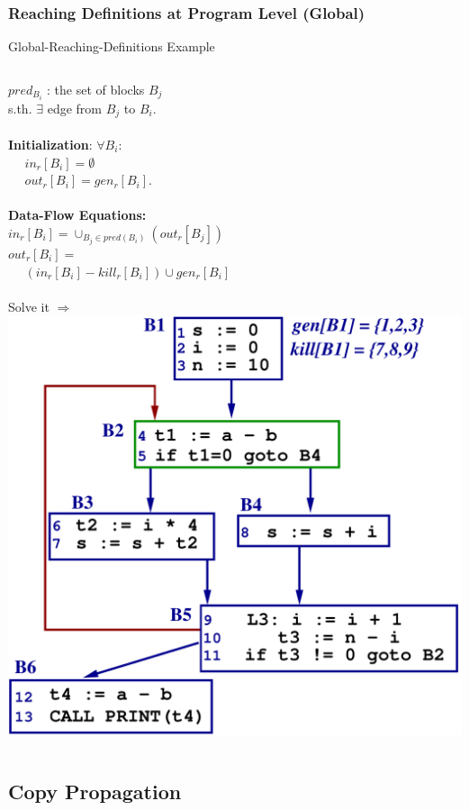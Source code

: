 \documentclass{beamer}
\renewcommand{\emph}[1]{\textcolor{structure}{#1}}
\newcommand{\emp}[1]{\textcolor{DikuRed}{ #1}}
\begin{document}
\begin{frame}[fragile,t]
    \frametitle{Reaching Definitions at Program Level (Global)}


\begin{block}{Global-Reaching-Definitions Example}
\begin{columns}
\emph{$pred_{B_i}$} : the set of blocks $B_j$\\
s.th. $\exists$ edge from $B_j$ to $B_i$.\\
$\mbox{~~}$\\
\emph{\bf Initialization}: $\forall B_i$:\\
$\mbox{~~~~}in_r[B_i] = \emptyset$\\
$\mbox{~~~~}out_r[B_i] = gen_r[B_i]$.\\
$\mbox{~~}$\\
\emph{\bf Data-Flow Equations:}\\
$in_r[B_i] = \cup_{B_j\in pred(B_i)}(out_r[B_j])$\\
$out_r[B_i] =$\\
$\mbox{~~~~}(in_r[B_i] - kill_r[B_i]) \cup gen_r[B_i]$\\
$\mbox{~~}$\\
\emp{Solve it $\Rightarrow$}
\hspace{-3ex}\includegraphics[width=37ex]{Figures/LoopRDI}
\end{columns}
\end{block}

\end{frame}


\subsection{Copy Propagation}
\end{document}

